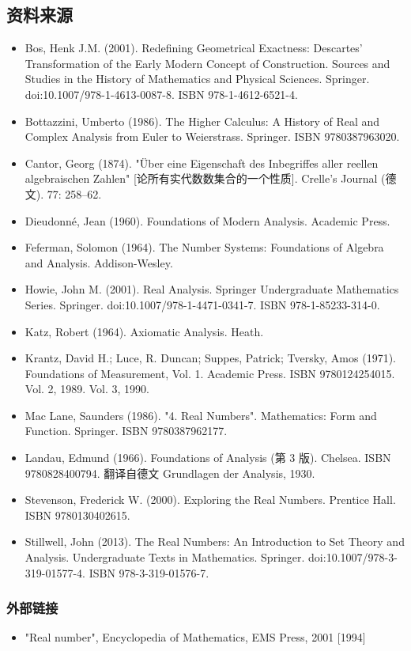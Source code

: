 \subsection{资料来源}
\begin{itemize}
\item Bos, Henk J.M. (2001). Redefining Geometrical Exactness: Descartes' Transformation of the Early Modern Concept of Construction. Sources and Studies in the History of Mathematics and Physical Sciences. Springer. doi:10.1007/978-1-4613-0087-8. ISBN 978-1-4612-6521-4.
\item Bottazzini, Umberto (1986). The Higher Calculus: A History of Real and Complex Analysis from Euler to Weierstrass. Springer. ISBN 9780387963020.
\item Cantor, Georg (1874). "Über eine Eigenschaft des Inbegriffes aller reellen algebraischen Zahlen" [论所有实代数数集合的一个性质]. Crelle's Journal (德文). 77: 258–62.
\item Dieudonné, Jean (1960). Foundations of Modern Analysis. Academic Press.
\item Feferman, Solomon (1964). The Number Systems: Foundations of Algebra and Analysis. Addison-Wesley.
\item  Howie, John M. (2001). Real Analysis. Springer Undergraduate Mathematics Series. Springer. doi:10.1007/978-1-4471-0341-7. ISBN 978-1-85233-314-0.
\item Katz, Robert (1964). Axiomatic Analysis. Heath.
\item Krantz, David H.; Luce, R. Duncan; Suppes, Patrick; Tversky, Amos (1971). Foundations of Measurement, Vol. 1. Academic Press. ISBN 9780124254015. Vol. 2, 1989. Vol. 3, 1990.
\item Mac Lane, Saunders (1986). "4. Real Numbers". Mathematics: Form and Function. Springer. ISBN 9780387962177.
\item Landau, Edmund (1966). Foundations of Analysis (第 3 版). Chelsea. ISBN 9780828400794. 翻译自德文 Grundlagen der Analysis, 1930.
\item Stevenson, Frederick W. (2000). Exploring the Real Numbers. Prentice Hall. ISBN 9780130402615.
\item Stillwell, John (2013). The Real Numbers: An Introduction to Set Theory and Analysis. Undergraduate Texts in Mathematics. Springer. doi:10.1007/978-3-319-01577-4. ISBN 978-3-319-01576-7.
\end{itemize}
\subsubsection{外部链接}
\begin{itemize}
\item "Real number", Encyclopedia of Mathematics, EMS Press, 2001 [1994]
\end{itemize}
